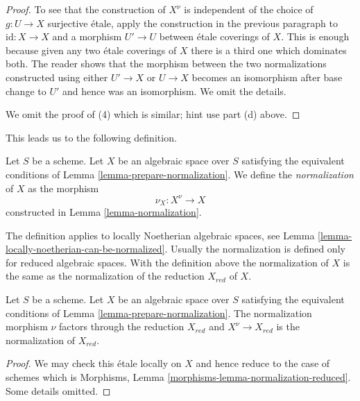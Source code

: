 \begin{proof}
\medskip\noindent
To see that the construction of $X^\nu$ is independent of the choice
of $g : U \to X$ surjective \'etale, apply the construction in the
previous paragraph to $\text{id} : X \to X$ and a morphism
$U' \to U$ between \'etale coverings of $X$. This is enough because
given any two \'etale coverings of $X$ there is a third one which
dominates both. The reader shows that the morphism between the two
normalizations constructed using either $U' \to X$ or $U \to X$
becomes an isomorphism after base change to $U'$ and hence was
an isomorphism. We omit the details.

\medskip\noindent
We omit the proof of (4) which is similar; hint use part (d) above.
\end{proof}

\noindent
This leads us to the following definition.

\begin{definition}
\label{definition-normalization}
Let $S$ be a scheme. Let $X$ be an algebraic space over $S$ satisfying the
equivalent conditions of Lemma \ref{lemma-prepare-normalization}.
We define the {\it normalization} of $X$ as the morphism
$$
\nu_X : X^\nu \longrightarrow X
$$
constructed in Lemma \ref{lemma-normalization}.
\end{definition}

\noindent
The definition applies to locally Noetherian algebraic
spaces, see Lemma \ref{lemma-locally-noetherian-can-be-normalized}.
Usually the normalization is defined only for reduced algebraic
spaces. With the definition above the normalization of $X$ is the same
as the normalization of the reduction $X_{red}$ of $X$.

\begin{lemma}
\label{lemma-normalization-reduced}
Let $S$ be a scheme. Let $X$ be an algebraic space over $S$ satisfying the
equivalent conditions of Lemma \ref{lemma-prepare-normalization}.
The normalization morphism $\nu$ factors through the reduction $X_{red}$
and $X^\nu \to X_{red}$ is the normalization of $X_{red}$.
\end{lemma}

\begin{proof}
We may check this \'etale locally on $X$ and hence reduce to the case
of schemes which is
Morphisms, Lemma \ref{morphisms-lemma-normalization-reduced}.
Some details omitted.
\end{proof}

